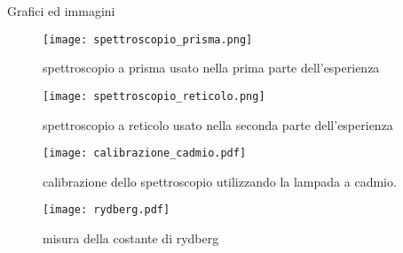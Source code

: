 \begin{section}{Grafici ed immagini}
\begin{figure}[h]
	\centering
	\texttt{[image: spettroscopio\_prisma.png]}
	\caption{spettroscopio a prisma usato nella prima parte dell'esperienza}
	\label{f:spettroscopio_prisma}
\end{figure}

\begin{figure}[h]
	\centering
	\texttt{[image: spettroscopio\_reticolo.png]}
	\caption{spettroscopio a reticolo usato nella seconda parte dell'esperienza}
	\label{f:spettroscopio_reticolo}
\end{figure}


\begin{figure}[h]
	\centering
	\texttt{[image: calibrazione\_cadmio.pdf]}
	\caption{calibrazione dello spettroscopio utilizzando la lampada a cadmio.}
	\label{f:calibrazione_cadmio}
\end{figure}


\begin{figure}[h]
	\centering
	\texttt{[image: rydberg.pdf]}
	\caption{misura della costante di rydberg}
	\label{f:rydberg}
\end{figure}

\end{section}